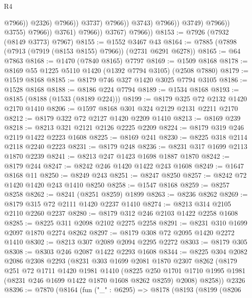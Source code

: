 \begin{lexlean}{R4}
\begin{coremodule}
                                                  @7966))
                                              @2326)
                                            @7966))
                                        @3737)
                                      @7966))
                                  @3743)
                                @7966))
                            @3749)
                          @7966))
                      @3755)
                    @7966))
                @3761)
              @7966))
          @3767)
        @7966))
@8153 := @7926 (@7932 (@8149 @3773) @7967)
@8155 := @1552 @3467 @43
@8164 := @7885 (@7898 (@7913 (@7919 (@8153 @8155) @7966)) (@2731 @6291 @6278))
@8165 := @64 @7863
@8168 := @1470 (@7840 @8165) @7797
@8169 := @1509 @8168
@8178 := @8169 @55 @1225 @5110 @1420 (@1392 @7794 @3105) (@2508 @7880)
@8179 := @1519 @8168
@8185 := @8179 @746 @327 @1420 @3025 @7794 @3105
@8186 := @1528 @8168
@8188 := @8186 @224 @7794
@8189 := @1534 @8168
@8193 := @8185 (@8188 (@1533 (@8189 @224)))
@8199 := @8179 @325 @72 @2132 @1420 @2170 @1410
@8206 := @1597 @8168 @301 @324 @2129 @2131 @2211 @2170
@8212 := @8179 @322 @72 @2127 @1420 @2209 @1410
@8213 := @8169 @239
@8218 := @8213 @321 @2121 @2126 @2225 @2209
@8224 := @8179 @319 @246 @2119 @1422 @2223 @1608
@8225 := @8169 @241
@8230 := @8225 @318 @2114 @2118 @2240 @2223
@8231 := @8179 @248
@8236 := @8231 @317 @1699 @2113 @1870 @2239
@8241 := @8213 @247 @1423 @1698 @1887 @1870
@8242 := @8179 @244
@8247 := @8242 @246 @1420 @1422 @243 @1608
@8249 := @1647 @8168 @11
@8250 := @8249 @243
@8251 := @8247 @8250
@8257 := @8242 @72 @1420 @1420 @243 @1410 @8250
@8258 := @1547 @8168
@8259 := @8257 @8258
@8262 := @8241 (@8251 @8259) @1899
@8263 := @8236 @8262
@8269 := @8179 @315 @72 @2111 @1420 @2237 @1410
@8274 := @8213 @314 @2105 @2110 @2260 @2237
@8280 := @8179 @312 @246 @2103 @1422 @2258 @1608
@8285 := @8225 @311 @2098 @2102 @2275 @2258
@8291 := @8231 @310 @1699 @2097 @1870 @2274 @8262
@8297 := @8179 @308 @72 @2095 @1420 @2272 @1410
@8302 := @8213 @307 @2089 @2094 @2295 @2272
@8303 := @8179 @305
@8308 := @8303 @246 @2087 @1422 @2293 @1608
@8344 := @8225
    @304
    @2082
    @2086
    @2308
    @2293
    (@8231
      @303
      @1699
      @2081
      @1870
      @2307
      @8262
      (@8179
        @251
        @72
        @1711
        @1420
        @1981
        @1410
        (@8225 @250 @1701 @1710 @1995 @1981 (@8231 @246 @1699 @1422 @1870 @1608 @8262 @8259) @2008)
        @8258))
    @2326
@8396 := @7870
    (@8164
      (fun ("_" : @6295) =>
      @8178
        (@8193
          (@8199
            (@8206

\end{coremodule}
\end{lexlean}
